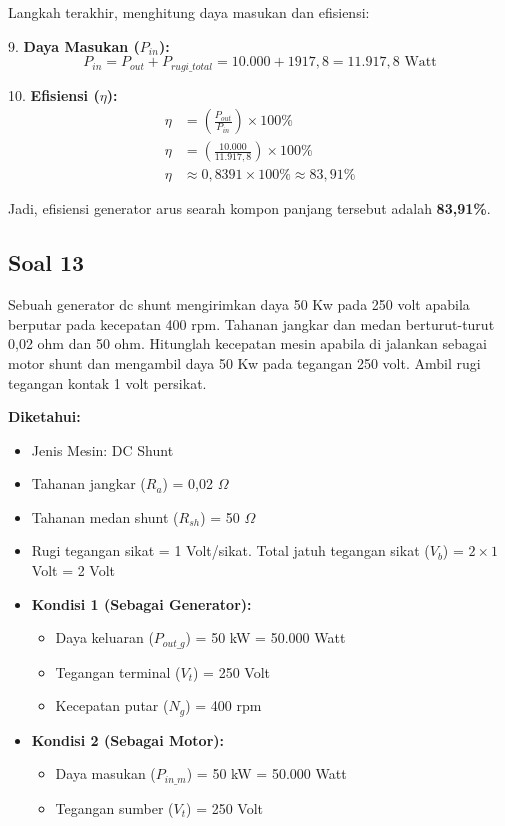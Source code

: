 \documentclass[12pt, a4paper]{article}
\begin{document}
Langkah terakhir, menghitung daya masukan dan efisiensi:

9. \textbf{Daya Masukan ($P_{in}$):}
\[
    P_{in} = P_{out} + P_{rugi\_total} = 10.000 + 1917,8 = 11.917,8 \text{ Watt}
\]

10. \textbf{Efisiensi ($\eta$):}
\begin{align*}
    \eta &= \left( \frac{P_{out}}{P_{in}} \right) \times 100\% \\
    \eta &= \left( \frac{10.000}{11.917,8} \right) \times 100\% \\
    \eta &\approx 0,8391 \times 100\% \approx 83,91\%
\end{align*}

Jadi, efisiensi generator arus searah kompon panjang tersebut adalah \textbf{83,91\%}.

\subsection*{Soal 13}
Sebuah generator dc shunt mengirimkan daya 50 Kw pada 250 volt apabila berputar pada kecepatan 400 rpm. Tahanan jangkar dan medan berturut-turut 0,02 ohm dan 50 ohm. Hitunglah kecepatan mesin apabila di jalankan sebagai motor shunt dan mengambil daya 50 Kw pada tegangan 250 volt. Ambil rugi tegangan kontak 1 volt persikat.

\textbf{Diketahui:}
\begin{itemize}
    \item Jenis Mesin: DC Shunt
    \item Tahanan jangkar ($R_a$) = 0,02 $\Omega$
    \item Tahanan medan shunt ($R_{sh}$) = 50 $\Omega$
    \item Rugi tegangan sikat = 1 Volt/sikat. Total jatuh tegangan sikat ($V_b$) = $2 \times 1$ Volt = 2 Volt
    \item \textbf{Kondisi 1 (Sebagai Generator):}
    \begin{itemize}
        \item Daya keluaran ($P_{out\_g}$) = 50 kW = 50.000 Watt
        \item Tegangan terminal ($V_t$) = 250 Volt
        \item Kecepatan putar ($N_g$) = 400 rpm
    \end{itemize}
    \item \textbf{Kondisi 2 (Sebagai Motor):}
    \begin{itemize}
        \item Daya masukan ($P_{in\_m}$) = 50 kW = 50.000 Watt
        \item Tegangan sumber ($V_t$) = 250 Volt
    \end{itemize}
\end{itemize}
\end{document}
